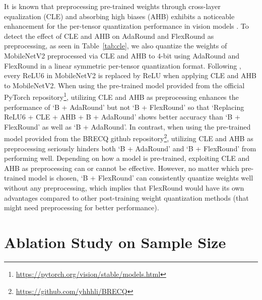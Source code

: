 \documentclass{article}
\theoremstyle{plain}
\theoremstyle{definition}
\theoremstyle{remark}
\begin{document}
It is known that preprocessing pre-trained weights through cross-layer equalization (CLE) and absorbing high biases (AHB) exhibits a noticeable enhancement for the per-tensor quantization performance in vision models \citep{nagel2019data, nagel2021white}. To detect the effect of CLE and AHB on AdaRound and FlexRound as preprocessing, as seen in Table~\ref{tab:cle}, we also quantize the weights of MobileNetV2 preprocessed via CLE and AHB to $4$-bit using AdaRound and FlexRound in a linear symmetric per-tensor quantization format. %
Following \citet{nagel2019data}, every ReLU6 in MobileNetV2 is replaced by ReLU when applying CLE and AHB to MobileNetV2.
When using the pre-trained model provided from the official PyTorch repository\footnote{\url{https://pytorch.org/vision/stable/models.html}}, utilizing CLE and AHB as preprocessing enhances the performance of `B + AdaRound' but not `B + FlexRound' so that `Replacing ReLU6 + CLE + AHB + B + AdaRound' shows better accuracy than `B + FlexRound' as well as `B + AdaRound'. In contrast, when using the pre-trained model provided from the BRECQ github repository\footnote{\url{https://github.com/yhhhli/BRECQ}}, utilizing CLE and AHB as preprocessing seriously hinders both `B + AdaRound' and `B + FlexRound' from performing well. %
Depending on how a model is pre-trained, exploiting CLE and AHB as preprocessing can or cannot be effective. However, no matter which pre-trained model is chosen, `B + FlexRound' can consistently quantize weights well without any preprocessing, which implies that FlexRound would have its own advantages compared to other post-training weight quantization methods (that might need preprocessing for better performance).

\newpage


\section{Ablation Study on Sample Size}
\end{document}
